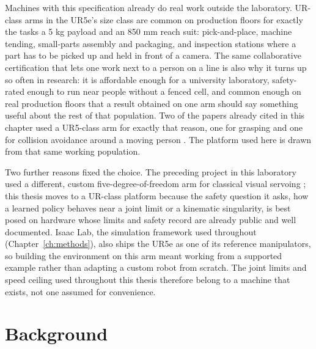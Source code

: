 Machines with this specification already do real work outside the laboratory. UR-class arms in
the UR5e's size class are common on production floors for exactly the tasks a 5 kg payload and an
850 mm reach suit: pick-and-place, machine tending, small-parts assembly and packaging, and
inspection stations where a part has to be picked up and held in front of a camera. The same
collaborative certification that lets one work next to a person on a line is also why it turns up
so often in research: it is affordable enough for a university laboratory, safety-rated enough to
run near people without a fenced cell, and common enough on real production floors that a result
obtained on one arm should say something useful about the rest of that population. Two of the
papers already cited in this chapter used a UR5-class arm for exactly that reason, one for
grasping \cite{ferreira2025grasping} and one for collision avoidance around a moving person
\cite{xia2024proactive}. The platform used here is drawn from that same working population.

Two further reasons fixed the choice. The preceding project in this laboratory used a
different, custom five-degree-of-freedom arm for classical visual servoing
\cite{khan2025csrt_ibvs}; this thesis moves to a UR-class platform because the safety question it
asks, how a learned policy behaves near a joint limit or a kinematic singularity, is best posed on
hardware whose limits and safety record are already public and well documented. Isaac Lab, the
simulation framework used throughout (Chapter~\ref{ch:methods}), also ships the UR5e as one of its
reference manipulators, so building the environment on this arm meant working from a supported
example rather than adapting a custom robot from scratch. The joint limits and speed ceiling used
throughout this thesis therefore belong to a machine that exists, not one assumed for convenience.

\section{Background}\label{sec:i-background}

